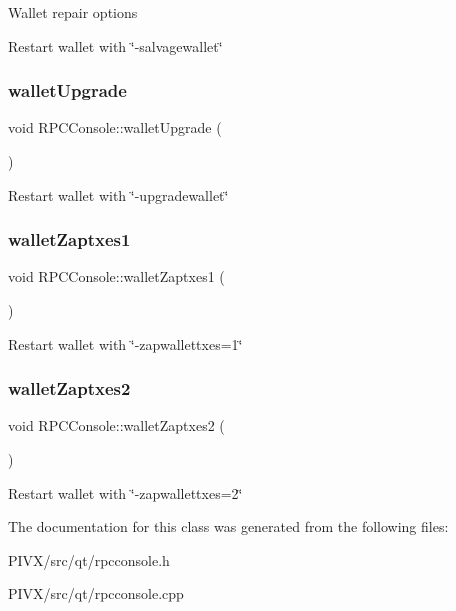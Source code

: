 Wallet repair options

Restart wallet with \char`\"{}-\/salvagewallet\char`\"{} \mbox{\label{class_r_p_c_console_a5ba9075f3f7dad2e84302ea3da9f51af}} 
\subsubsection{\texorpdfstring{wallet\+Upgrade}{walletUpgrade}}
{\footnotesize\ttfamily void R\+P\+C\+Console\+::wallet\+Upgrade (\begin{DoxyParamCaption}{ }\end{DoxyParamCaption})\hspace{0.3cm}{\ttfamily [slot]}}

Restart wallet with \char`\"{}-\/upgradewallet\char`\"{} \mbox{\label{class_r_p_c_console_ab99e8a7e0a6164126aa18c59827722d5}} 
\subsubsection{\texorpdfstring{wallet\+Zaptxes1}{walletZaptxes1}}
{\footnotesize\ttfamily void R\+P\+C\+Console\+::wallet\+Zaptxes1 (\begin{DoxyParamCaption}{ }\end{DoxyParamCaption})\hspace{0.3cm}{\ttfamily [slot]}}

Restart wallet with \char`\"{}-\/zapwallettxes=1\char`\"{} \mbox{\label{class_r_p_c_console_ab96912afa85d43a67a4db4869faccdd9}} 
\subsubsection{\texorpdfstring{wallet\+Zaptxes2}{walletZaptxes2}}
{\footnotesize\ttfamily void R\+P\+C\+Console\+::wallet\+Zaptxes2 (\begin{DoxyParamCaption}{ }\end{DoxyParamCaption})\hspace{0.3cm}{\ttfamily [slot]}}

Restart wallet with \char`\"{}-\/zapwallettxes=2\char`\"{} 

The documentation for this class was generated from the following files\+:\begin{DoxyCompactItemize}
\item 
P\+I\+V\+X/src/qt/rpcconsole.\+h\item 
P\+I\+V\+X/src/qt/rpcconsole.\+cpp\end{DoxyCompactItemize}
